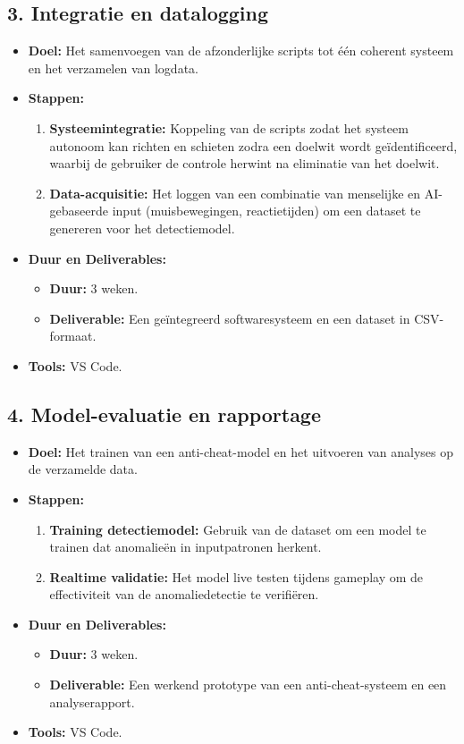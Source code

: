 \subsection{3. Integratie en datalogging}
\begin{itemize}
    \item \textbf{Doel:} Het samenvoegen van de afzonderlijke scripts tot één coherent systeem en het verzamelen van logdata.
    \item \textbf{Stappen:}
    \begin{enumerate}
        \item \textbf{Systeemintegratie:} Koppeling van de scripts zodat het systeem autonoom kan richten en schieten zodra een doelwit wordt geïdentificeerd, waarbij de gebruiker de controle herwint na eliminatie van het doelwit.
        \item \textbf{Data-acquisitie:} Het loggen van een combinatie van menselijke en AI-gebaseerde input (muisbewegingen, reactietijden) om een dataset te genereren voor het detectiemodel.
    \end{enumerate}
    \item \textbf{Duur en Deliverables:}
    \begin{itemize}
        \item \textbf{Duur:} 3 weken.
        \item \textbf{Deliverable:} Een geïntegreerd softwaresysteem en een dataset in CSV-formaat.
    \end{itemize}
    \item \textbf{Tools:} VS Code.
\end{itemize}

\subsection{4. Model-evaluatie en rapportage}
\begin{itemize}
    \item \textbf{Doel:} Het trainen van een anti-cheat-model en het uitvoeren van analyses op de verzamelde data.
    \item \textbf{Stappen:}
    \begin{enumerate}
        \item \textbf{Training detectiemodel:} Gebruik van de dataset om een model te trainen dat anomalieën in inputpatronen herkent.
        \item \textbf{Realtime validatie:} Het model live testen tijdens gameplay om de effectiviteit van de anomaliedetectie te verifiëren.
    \end{enumerate}
    \item \textbf{Duur en Deliverables:}
    \begin{itemize}
        \item \textbf{Duur:} 3 weken.
        \item \textbf{Deliverable:} Een werkend prototype van een anti-cheat-systeem en een analyserapport.
    \end{itemize}
    \item \textbf{Tools:} VS Code.
\end{itemize}

